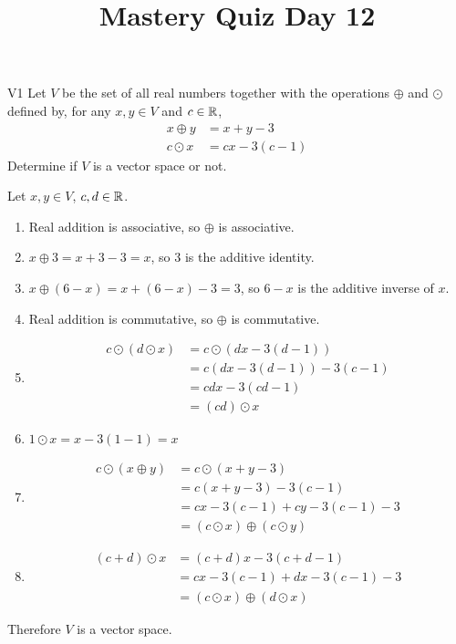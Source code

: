 \documentclass{sbgLAquiz}
\title{Mastery Quiz Day 12 }
\begin{document}
\begin{problem}{V1}
Let $V$ be the  set of all real numbers together with the operations $\oplus$ and $\odot$ defined by, for any $x,y \in V$ and $c \in \mathbb{R}$,
\begin{align*}
x\oplus y  &= x+y-3 \\
c \odot x &= cx-3(c-1)
\end{align*}
Determine if $V$ is a vector space or not.
\end{problem}

\begin{solution}
Let $x,y \in V$, $c,d \in \mathbb{R}$.
\begin{enumerate}[1)]
\item Real addition is associative, so $\oplus$ is associative.
\item $x\oplus 3 = x+3-3=x$, so $3$ is the additive identity.
\item $x \oplus (6-x) = x+(6-x)-3=3$, so $6-x$ is the additive inverse of $x$.
\item Real addition is commutative, so $\oplus$ is commutative.
\item \begin{align*}
c\odot \left( d \odot x\right) &= c\odot \left( dx-3(d-1) \right) \\
&= c\left(dx-3(d-1)\right)-3(c-1) \\
&= cdx-3(cd-1) \\
&= (cd) \odot x
\end{align*}
\item $1 \odot x = x-3(1-1)=x$
\item \begin{align*} c \odot (x \oplus y) &=
c \odot (x+y-3) \\
&= c(x+y-3)-3(c-1) \\
&= cx-3(c-1) + cy-3(c-1) -3 \\
&= (c\odot x ) \oplus (c\odot y)
\end{align*}
\item \begin{align*} (c+d) \odot x &= (c+d)x-3(c+d-1) \\
&= cx-3(c-1)+dx-3(c-1)-3 \\
&= (c\odot x ) \oplus (d \odot x)
\end{align*}
\end{enumerate}

Therefore $V$ is a vector space.
\end{solution}
\end{document}
